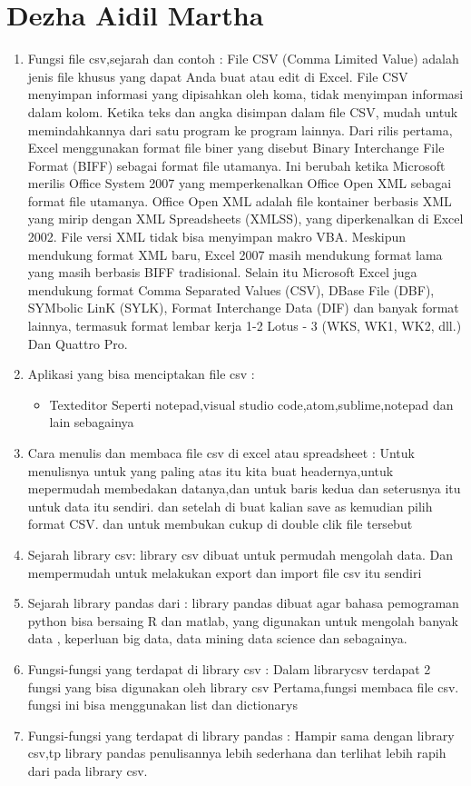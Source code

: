 \section{Dezha Aidil Martha}
\begin{enumerate}
\item Fungsi file csv,sejarah dan contoh :
File CSV (Comma Limited Value) adalah jenis file khusus yang dapat Anda buat atau edit di Excel. File CSV menyimpan informasi yang dipisahkan oleh koma, tidak menyimpan informasi dalam kolom. Ketika teks dan angka disimpan dalam file CSV, mudah untuk memindahkannya dari satu program ke program lainnya.
Dari rilis pertama, Excel menggunakan format file biner yang disebut Binary Interchange File Format (BIFF) sebagai format file utamanya. Ini berubah ketika Microsoft merilis Office System 2007 yang memperkenalkan Office Open XML sebagai format file utamanya. Office Open XML adalah file kontainer berbasis XML yang mirip dengan XML Spreadsheets (XMLSS), yang diperkenalkan di Excel 2002. File versi XML tidak bisa menyimpan makro VBA.
Meskipun mendukung format XML baru, Excel 2007 masih mendukung format lama yang masih berbasis BIFF tradisional. Selain itu Microsoft Excel juga mendukung format Comma Separated Values (CSV), DBase File (DBF), SYMbolic LinK (SYLK), Format Interchange Data (DIF) dan banyak format lainnya, termasuk format lembar kerja 1-2 Lotus - 3 (WKS, WK1, WK2, dll.) Dan Quattro Pro.
\item Aplikasi yang bisa menciptakan file csv :
\begin{itemize}
\item Texteditor
Seperti notepad,visual studio code,atom,sublime,notepad dan lain sebagainya
\end{itemize}
\item Cara menulis dan membaca file csv di excel atau spreadsheet :
Untuk menulisnya untuk yang paling atas itu kita buat headernya,untuk mepermudah membedakan datanya,dan untuk baris kedua dan seterusnya itu untuk data itu sendiri.
dan setelah di buat kalian save as kemudian pilih format CSV.
dan untuk membukan cukup di double clik file tersebut
\item Sejarah library csv:
library csv dibuat untuk permudah mengolah data. Dan mempermudah untuk melakukan export dan import file csv itu sendiri
\item Sejarah library pandas dari :
library pandas dibuat agar bahasa pemograman python bisa bersaing R dan matlab, yang digunakan untuk mengolah banyak data , keperluan big data, data mining data science dan sebagainya.
\item Fungsi-fungsi yang terdapat di library csv :
Dalam librarycsv terdapat 2 fungsi yang bisa digunakan oleh library csv
Pertama,fungsi membaca file csv.
fungsi ini bisa menggunakan list dan dictionarys
\item Fungsi-fungsi yang terdapat di library pandas :
Hampir sama dengan library csv,tp library pandas penulisannya lebih sederhana dan terlihat lebih rapih dari pada library csv.
\end{enumerate}
